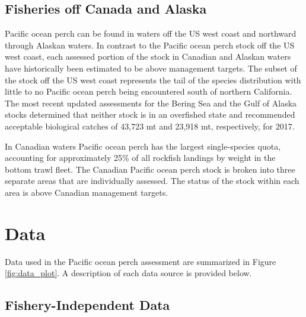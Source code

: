 \documentclass[12pt,]{article}
\begin{document}
\subsection{Fisheries off Canada and
Alaska}\label{fisheries-off-canada-and-alaska}

Pacific ocean perch can be found in waters off the US west coast and
northward through Alaskan waters. In contrast to the Pacific ocean perch
stock off the US west coast, each assessed portion of the stock in
Canadian and Alaskan waters have historically been estimated to be above
management targets. The subset of the stock off the US west coast
represents the tail of the species distribution with little to no
Pacific ocean perch being encountered south of northern California. The
most recent updated assessments for the Bering Sea and the Gulf of
Alaska stocks determined that neither stock is in an overfished state
and recommended acceptable biological catches of 43,723 mt and 23,918
mt, respectively, for 2017.

In Canadian waters Pacific ocean perch has the largest single-species
quota, accounting for approximately 25\% of all rockfish landings by
weight in the bottom trawl fleet. The Canadian Pacific ocean perch stock
is broken into three separate areas that are individually assessed. The
status of the stock within each area is above Canadian management
targets.

\section{Data}\label{data}

Data used in the Pacific ocean perch assessment are summarized in Figure
\ref{fig:data_plot}. A description of each data source is provided
below.

\subsection{Fishery-Independent Data}\label{fishery-independent-data}
\end{document}
